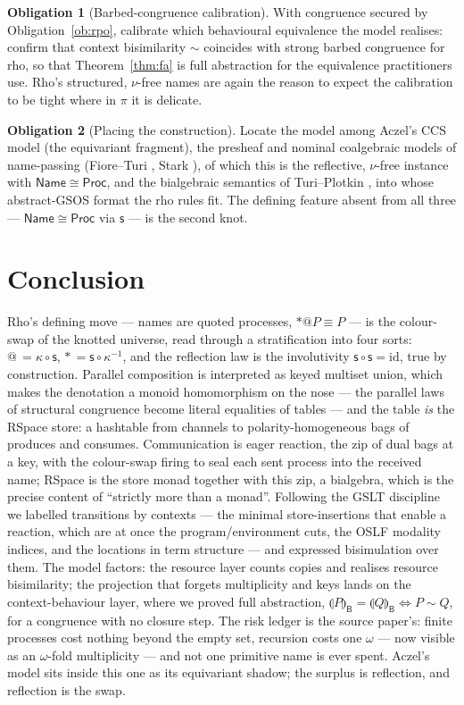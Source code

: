 \documentclass[11pt]{article}
\makeatletter
\newcommand{\swp}{\mathsf{s}}                  %
\newcommand{\kt}{\kappa}                       %
\newcommand{\drp}[1]{{\ast}#1}
\newcommand{\quo}[1]{@#1}
\newcommand{\Proc}{\mathsf{Proc}}
\newcommand{\Name}{\mathsf{Name}}
\newcommand{\B}{\mathsf{B}}
\newcommand{\sem}[1]{\llparenthesis #1\rrparenthesis}   %
\newcommand{\bis}{\sim}
\newcommand{\scong}{\equiv}
\theoremstyle{plain}
\theoremstyle{definition}
\newtheorem{obligation}{Obligation}
\makeatother
\begin{document}
\begin{obligation}[Barbed-congruence calibration]\label{ob:cong}
With congruence secured by Obligation~\ref{ob:rpo}, calibrate which behavioural
equivalence the model realises: confirm that context bisimilarity $\bis$ coincides
with strong barbed congruence for rho, so that Theorem~\ref{thm:fa} is full
abstraction for the equivalence practitioners use. Rho's structured, $\nu$-free
names are again the reason to expect the calibration to be tight where in $\pi$ it
is delicate.
\end{obligation}

\begin{obligation}[Placing the construction]\label{ob:place}
Locate the model among Aczel's CCS model \cite{aczel} (the equivariant fragment),
the presheaf and nominal coalgebraic models of name-passing
(Fiore--Turi \cite{fioreturi}, Stark \cite{stark}), of which this is the
reflective, $\nu$-free instance with $\Name\cong\Proc$, and the bialgebraic
semantics of Turi--Plotkin \cite{turiplotkin}, into whose abstract-GSOS format the
rho rules fit. The defining feature absent from all three --- $\Name\cong\Proc$ via
$\swp$ --- is the second knot.
\end{obligation}

\section{Conclusion}

Rho's defining move --- names are quoted processes, $\drp{\quo P}\scong P$ --- is
the colour-swap of the knotted universe, read through a stratification into four
sorts: $\quo{\,}=\kt\circ\swp$, $\drp{\,}=\swp\circ\kt^{-1}$, and the reflection
law is the involutivity $\swp\circ\swp=\mathrm{id}$, true by construction. Parallel
composition is interpreted as keyed multiset union, which makes the denotation a
monoid homomorphism on the nose --- the parallel laws of structural congruence
become literal equalities of tables --- and the table \emph{is} the RSpace store:
a hashtable from channels to polarity-homogeneous bags of produces and consumes.
Communication is eager reaction, the zip of dual bags at a key, with the
colour-swap firing to seal each sent process into the received name; RSpace is the
store monad together with this zip, a bialgebra, which is the precise content of
``strictly more than a monad''. Following the GSLT discipline we labelled
transitions by contexts --- the minimal store-insertions that enable a reaction,
which are at once the program/environment cuts, the OSLF modality indices, and the
locations in term structure --- and expressed bisimulation over them. The model
factors: the resource layer counts copies and realises resource bisimilarity; the
projection that forgets multiplicity and keys lands on the context-behaviour layer,
where we proved full abstraction, $\sem P_{\B}=\sem Q_{\B}\iff P\bis Q$, for a
congruence with no closure step. The risk ledger is the source paper's: finite
processes cost nothing beyond the empty set, recursion costs one $\omega$ --- now
visible as an $\omega$-fold multiplicity --- and not one primitive name is ever
spent. Aczel's model sits inside this one as its equivariant shadow; the surplus is
reflection, and reflection is the swap.
\end{document}
